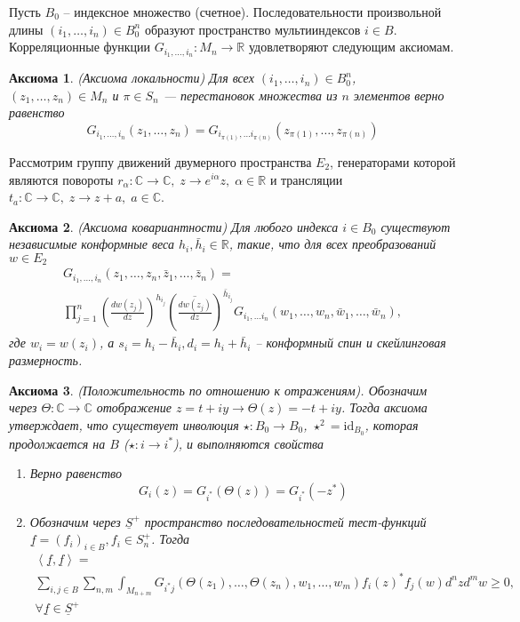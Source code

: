 \documentclass[12pt]{article}
\newtheorem{axiom}{Аксиома}
\begin{document}
Пусть $B_{0}$ -- индексное множество (счетное). Последовательности произвольной длины
$(i_{1},\dots,i_{n})\in B_{0}^{n}$ образуют пространство мультииндексов $i\in B$. Корреляционные
функции $G_{i_{1},\dots, i_{n}}:M_{n}\to \mathbb{R}$ удовлетворяют следующим аксиомам.
\begin{axiom}
  (Аксиома локальности) Для всех $(i_{1},\dots,i_{n})\in B_{0}^{n}$, $(z_{1},\dots, z_{n})\in M_{n}$
  и $\pi\in S_{n}$ --- перестановок множества из $n$ элементов верно равенство
  \begin{equation}
    \label{eq:51}
    G_{i_{1},\dots,i_{n}}(z_{1},\dots,z_{n})=G_{i_{\pi(1)},\dots i_{\pi(n)}}(z_{\pi(1)},\dots, z_{\pi(n)})
  \end{equation}
\end{axiom}
Рассмотрим группу движений двумерного пространства $E_{2}$, генераторами которой являются повороты
$r_{\alpha}:\mathbb{C}\to\mathbb{C}, \; z\to e^{i\alpha}z,\; \alpha\in \mathbb{R}$ и трансляции
$t_{a}:\mathbb{C}\to\mathbb{C},\; z\to z+a,\; a\in\mathbb{C}$.
\begin{axiom}
  (Аксиома ковариантности) Для любого индекса $i\in B_{0}$ существуют независимые конформные веса
  $h_{i},\bar h_{i}\in \mathbb{R}$, такие, что для всех преобразований $w\in E_{2}$
  \begin{multline}
    \label{eq:52}
    G_{i_{1},\dots,i_{n}}(z_{1},\dots,z_{n},\bar z_{1},\dots, \bar z_{n})=\\
    \prod_{j=1}^{n}\left(\frac{dw(z_{j})}{dz}\right)^{h_{i_{j}}}\left(\overline{\frac{dw(z_{j})}{dz}}\right)^{\bar{h}_{i_{j}}}
    G_{i_1,\dots i_n}(w_{1},\dots, w_{n},\bar w_{1},\dots,\bar w_{n}),
  \end{multline}
  где $w_{i}=w(z_{i})$, а $s_{i}=h_{i}-\bar h_{i}, d_{i}=h_{i}+\bar h_{i}$ -- конформный спин и
  скейлинговая размерность.
\end{axiom}
\begin{axiom}
  (Положительность по отношению к отражениям). Обозначим через $\Theta:\mathbb{C}\to\mathbb{C}$
  отображение $z=t+i y\to \Theta(z)= -t+i y$. Тогда аксиома утверждает, что существует инволюция
  $\star:B_{0}\to B_{0}$, $\star^{2}=\mathrm{id}_{B_{0}}$, которая продолжается на $B$ ($\star:i\to
  i^{*}$), и выполняются свойства
  \begin{enumerate}
  \item Верно равенство
    \begin{equation}
      \label{eq:53}
      G_{i}(z)=G_{i^{*}}(\Theta(z))=G_{i^{*}}(-z^{*})
    \end{equation}
  \item Обозначим через $\underline{S}^{+}$ пространство последовательностей тест-функций
    $\underline{f}=(f_{i})_{i\in B}, f_{i}\in S^{+}_{n}$. Тогда
    \begin{multline}
      \label{eq:54}
      \left<\underline{f},\underline{f}\right>=\\
      \sum_{i,j\in B}\sum_{n,m}\int_{M_{n+m}}G_{i^{*} j}(\Theta(z_{1}),\dots ,\Theta(z_{n}),w_{1},\dots,w_{m}) f_{i}(z)^{*}f_{j}(w) d^{n}z d^{m}w 
      \geq 0,\\ \forall \underline{f}\in \underline{S}^{+}
    \end{multline}
  \end{enumerate}
\end{axiom}
\end{document}
